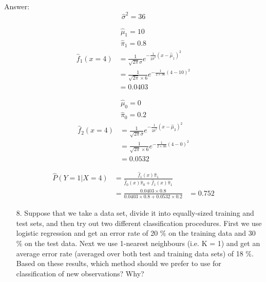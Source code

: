 \documentclass[12pt,a4paper]{article}%
\theoremstyle{definition}
\theoremstyle{plain}
\numberwithin{equation}{section}
\begin{document}
\begin{oframed}
Answer:~\\
$$ \hat{\sigma}^2 = 36 $$
\begin{minipage}{.5\linewidth}
\begin{gather*}
\hat{\mu}_{1} = 10 \\ 
\hat{\pi}_{1} = 0.8
\end{gather*}
\begin{align*}
\hat{f}_{1}(x=4) &= \frac{1}{\sqrt{2\pi}\hat{\sigma}} e^{-\frac{1}{2\hat{\sigma}^{2}}(x-\hat{\mu}_{1})^{2}} \\
				 &= \frac{1}{\sqrt{2\pi} \times 6} e^{-\frac{1}{2 \times 36}(4-10)^{2}} \\
				 &= 0.0403
\end{align*}
\end{minipage}%
\begin{minipage}{.5\linewidth}
\begin{gather*}
\hat{\mu}_{0} = 0 \\ 
\hat{\pi}_{0} = 0.2
\end{gather*}
\begin{align*}
\hat{f}_{2}(x=4) &= \frac{1}{\sqrt{2\pi}\hat{\sigma}} e^{-\frac{1}{2\hat{\sigma}^{2}}(x-\hat{\mu}_{2})^{2}} \\
				 &= \frac{1}{\sqrt{2\pi} \times 6} e^{-\frac{1}{2 \times 36}(4-0)^{2}} \\
				 &= 0.0532
\end{align*}
\end{minipage}
\begin{align*}
\hat{P}(Y=1|X=4) &= \frac{\hat{f}_{1}(x)\hat{\pi}_{1}}{\hat{f}_{0}(x)\hat{\pi}_{0}+\hat{f}_{1}(x)\hat{\pi}_{1}} \\
				 &= \frac{0.0403 \times 0.8}{0.0403 \times 0.8 + 0.0532 \times 0.2}
				 &= 0.752
\end{align*}
\end{oframed}
\begin{enumerate}
\item[8.] Suppose that we take a data set, divide it into equally-sized training and test sets, and then try out two different classification procedures.
First we use logistic regression and get an error rate of 20 \% on the training data and 30 \% on the test data. 
Next we use 1-nearest neighbours (i.e. K = 1) and get an average error rate 
(averaged over both test and training data sets) of 18 \%. Based on these results, which method should we prefer to use for classification of new observations?
Why?
\end{enumerate}
\end{document}
